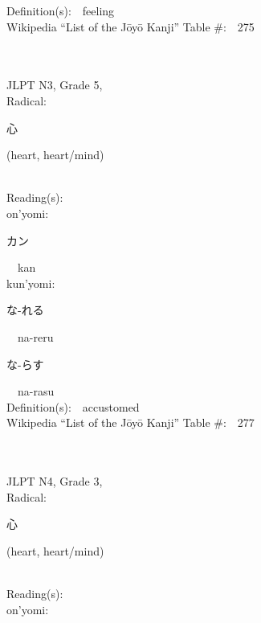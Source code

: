 \begin{multicols}{2}
Definition(s):\ \ feeling \\
Wikipedia ``List of the J\=oy\=o Kanji'' Table \#:\ \ 275 \\
\ \ \\
{\fontsize{34pt}{40pt}  }\ \ \\  %
{JLPT N3, Grade 5, \\Radical:\ \ {\begin{CJK}{UTF8}{min} 心 \end{CJK}} (heart, heart/mind) } \\
Reading(s):\ \ \\
{\hspace*{1em}}on'yomi:\ \ \\
{\hspace*{2em}}{\begin{CJK}{UTF8}{min} カン \end{CJK}}\ \ kan\ \ \\
{\hspace*{1em}}kun'yomi:\ \ \\
{\hspace*{2em}}{\begin{CJK}{UTF8}{min} な-れる \end{CJK}}\ \ na-reru\ \ \\
{\hspace*{2em}}{\begin{CJK}{UTF8}{min} な-らす \end{CJK}}\ \ na-rasu\ \ \\
Definition(s):\ \ accustomed \\
Wikipedia ``List of the J\=oy\=o Kanji'' Table \#:\ \ 277 \\
\ \ \\
{\fontsize{34pt}{40pt}  }\ \ \\  %
{JLPT N4, Grade 3, \\Radical:\ \ {\begin{CJK}{UTF8}{min} 心 \end{CJK}} (heart, heart/mind) } \\
Reading(s):\ \ \\
{\hspace*{1em}}on'yomi:\ \ \\

\end{multicols}
